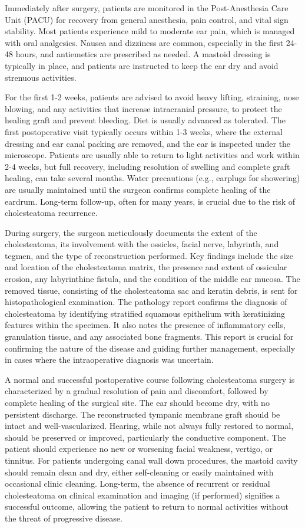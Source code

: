 Immediately after surgery, patients are monitored in the Post-Anesthesia Care Unit (PACU) for recovery from general anesthesia, pain control, and vital sign stability. Most patients experience mild to moderate ear pain, which is managed with oral analgesics. Nausea and dizziness are common, especially in the first 24-48 hours, and antiemetics are prescribed as needed. A mastoid dressing is typically in place, and patients are instructed to keep the ear dry and avoid strenuous activities. 

For the first 1-2 weeks, patients are advised to avoid heavy lifting, straining, nose blowing, and any activities that increase intracranial pressure, to protect the healing graft and prevent bleeding. Diet is usually advanced as tolerated. The first postoperative visit typically occurs within 1-3 weeks, where the external dressing and ear canal packing are removed, and the ear is inspected under the microscope. Patients are usually able to return to light activities and work within 2-4 weeks, but full recovery, including resolution of swelling and complete graft healing, can take several months. Water precautions (e.g., earplugs for showering) are usually maintained until the surgeon confirms complete healing of the eardrum. Long-term follow-up, often for many years, is crucial due to the risk of cholesteatoma recurrence.

During surgery, the surgeon meticulously documents the extent of the cholesteatoma, its involvement with the ossicles, facial nerve, labyrinth, and tegmen, and the type of reconstruction performed. Key findings include the size and location of the cholesteatoma matrix, the presence and extent of ossicular erosion, any labyrinthine fistula, and the condition of the middle ear mucosa. The removed tissue, consisting of the cholesteatoma sac and keratin debris, is sent for histopathological examination. The pathology report confirms the diagnosis of cholesteatoma by identifying stratified squamous epithelium with keratinizing features within the specimen. It also notes the presence of inflammatory cells, granulation tissue, and any associated bone fragments. This report is crucial for confirming the nature of the disease and guiding further management, especially in cases where the intraoperative diagnosis was uncertain.

A normal and successful postoperative course following cholesteatoma surgery is characterized by a gradual resolution of pain and discomfort, followed by complete healing of the surgical site. The ear should become dry, with no persistent discharge. The reconstructed tympanic membrane graft should be intact and well-vascularized. Hearing, while not always fully restored to normal, should be preserved or improved, particularly the conductive component. The patient should experience no new or worsening facial weakness, vertigo, or tinnitus. For patients undergoing canal wall down procedures, the mastoid cavity should remain clean and dry, either self-cleaning or easily maintained with occasional clinic cleaning. Long-term, the absence of recurrent or residual cholesteatoma on clinical examination and imaging (if performed) signifies a successful outcome, allowing the patient to return to normal activities without the threat of progressive disease.

